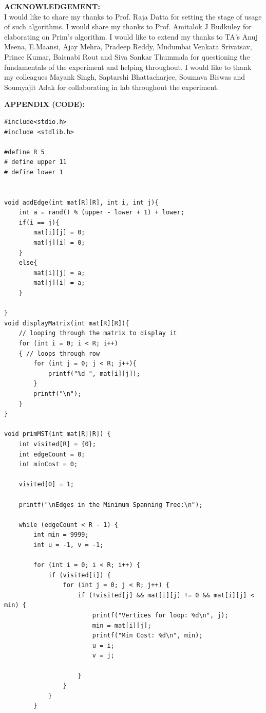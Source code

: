 \documentclass[a4paper,12pt]{article}
\begin{document}
\noindent
\textbf{ACKNOWLEDGEMENT: }\\
I would like to share my thanks to Prof. Raja Datta for setting the stage of usage of such algorithms. I would share my thanks to Prof. Amitalok J Budkuley for elaborating on Prim's algorithm. I would like to extend my thanks to TA's Anuj Meena, E.Maansi, Ajay Mehra, Pradeep Reddy, Mudumbai Venkata Srivatsav, Prince Kumar, Baisnabi Rout and Siva Sankar Thummala for questioning the fundamentals of the experiment and helping throughout. I would like to thank my colleagues Mayank Singh, Saptarshi Bhattacharjee, Soumava Biswas and Soumyajit Adak for collaborating in lab throughout the experiment. 
\noindent
\printbibliography

\noindent
\textbf{APPENDIX (CODE): }\\
\appendix
\begin{lstlisting}
#include<stdio.h>
#include <stdlib.h>

#define R 5
# define upper 11
# define lower 1


void addEdge(int mat[R][R], int i, int j){
    int a = rand() % (upper - lower + 1) + lower;
    if(i == j){
        mat[i][j] = 0;
        mat[j][i] = 0;
    }
    else{
        mat[i][j] = a;
        mat[j][i] = a;
    }
    
}
void displayMatrix(int mat[R][R]){
    // looping through the matrix to display it
    for (int i = 0; i < R; i++)
    { // loops through row
        for (int j = 0; j < R; j++){ 
            printf("%d ", mat[i][j]);
        }
        printf("\n");
    }
}

void primMST(int mat[R][R]) {
    int visited[R] = {0};
    int edgeCount = 0;
    int minCost = 0;

    visited[0] = 1;

    printf("\nEdges in the Minimum Spanning Tree:\n");

    while (edgeCount < R - 1) {
        int min = 9999;
        int u = -1, v = -1;

        for (int i = 0; i < R; i++) {
            if (visited[i]) {
                for (int j = 0; j < R; j++) {
                    if (!visited[j] && mat[i][j] != 0 && mat[i][j] < min) {
                        printf("Vertices for loop: %d\n", j);
                        min = mat[i][j];
                        printf("Min Cost: %d\n", min);
                        u = i;
                        v = j;
                        
                    }
                }
            }
        }


\end{lstlisting}
\end{document}
